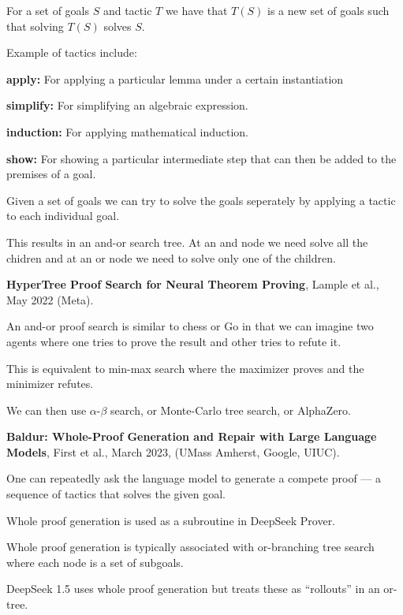 {\vfill
For a set of goals $S$ and tactic $T$ we have that $T(S)$ is a new set of goals such that solving $T(S)$ solves $S$.

\vfill
Example of tactics include:

\vfill
{\bf apply:} For applying a particular lemma under a certain instantiation

\vfill
{\bf simplify:} For simplifying an algebraic expression.

\vfill
{\bf induction:} For applying mathematical induction.

\vfill
{\bf show:} For showing a particular intermediate step that can then be added to the premises of a goal.


Given a set of goals we can try to solve the goals seperately by applying a tactic to each individual goal.

\vfill
This results in an and-or search tree.  At an and node we need solve all the chidren and at an or node we need to
solve only one of the children.

\vfill
{\bf HyperTree Proof Search for Neural Theorem Proving}, Lample et al., May 2022 (Meta).



An and-or proof search is similar to chess or Go in that we can imagine two agents where one tries to prove the result and other tries to refute it.

\vfill
This is equivalent to min-max search where the maximizer proves and the minimizer refutes.

\vfill
We can then use $\alpha$-$\beta$ search, or Monte-Carlo tree search, or AlphaZero.


{\bf Baldur: Whole-Proof Generation and Repair with Large Language Models}, First et al., March 2023, (UMass Amherst, Google, UIUC).

\vfill
One can repeatedly ask the language model to generate
a compete proof --- a sequence of tactics that solves the given goal.

\vfill
Whole proof generation is used as a subroutine in DeepSeek Prover.

\vfill
Whole proof generation is typically associated with or-branching tree search where each node is a set of subgoals.


DeepSeek 1.5 uses whole proof generation but treats these as ``rollouts'' in an or-tree.

}
